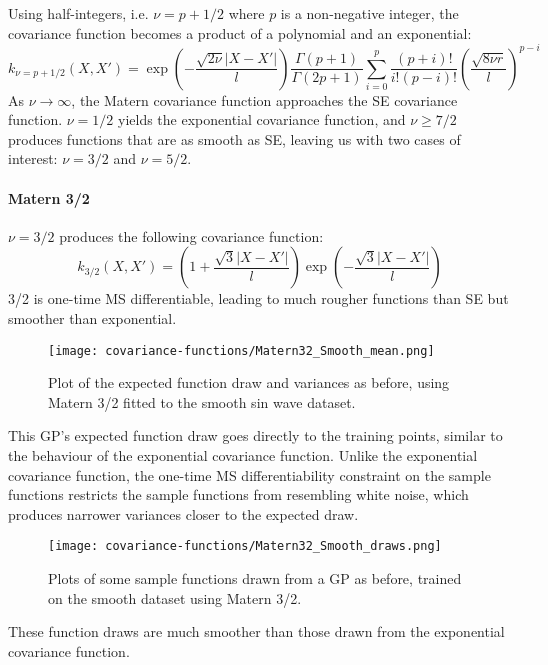 Using half-integers, i.e. $\nu = p + 1/2$ where $p$ is a non-negative integer, the covariance function becomes a product of a polynomial and an exponential:
\begin{equation*}
    k_{\nu = p + 1/2}(X,X') = \exp \left(- \frac{\sqrt{2\nu}|X - X'|}{l} \right) \frac{\Gamma(p+1)}{\Gamma(2p+1)} \sum_{i=0}^p \frac{(p + i)!}{i!(p-i)!} \left( \frac{\sqrt{8\nu r}}{l} \right)^{p-i}
\end{equation*}
As $\nu \to \infty$, the Matern covariance function approaches the SE covariance function. $\nu = 1/2$ yields the exponential covariance function, and $\nu \geq 7/2$ produces functions that are as smooth as SE, leaving us with two cases of interest: $\nu = 3/2$ and $\nu = 5/2$.

\paragraph{Matern 3/2}
$\nu = 3/2$ produces the following covariance function:
\begin{equation} \label{eq:matern-32}
    k_{3/2}(X,X') = \left(1 + \frac{\sqrt{3}|X - X'|}{l} \right) \exp \left(-\frac{\sqrt{3}|X - X'|}{l} \right)
\end{equation}
3/2 is one-time MS differentiable, leading to much rougher functions than SE but smoother than exponential.

\begin{figure}[H]
    \texttt{[image: covariance-functions/Matern32\_Smooth\_mean.png]}
    \caption{
        Plot of the expected function draw and variances as before, using Matern 3/2 fitted to the smooth sin wave dataset.
    }
\end{figure}
This GP's expected function draw goes directly to the training points, similar to the behaviour of the exponential covariance function. Unlike the exponential covariance function, the one-time MS differentiability constraint on the sample functions restricts the sample functions from resembling white noise, which produces narrower variances closer to the expected draw.

\begin{figure}[H]
    \texttt{[image: covariance-functions/Matern32\_Smooth\_draws.png]}
    \caption{
        Plots of some sample functions drawn from a GP as before, trained on the smooth dataset using Matern 3/2.
    }
\end{figure}
These function draws are much smoother than those drawn from the exponential covariance function.

